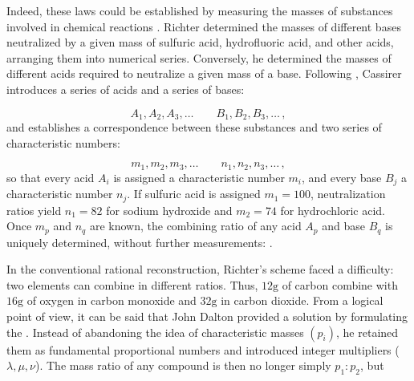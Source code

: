 \documentclass[submitted,12pt]{article}
\begin{document}
Indeed, these laws could be established by measuring the masses of substances involved in chemical reactions  . Richter determined the masses of different bases neutralized by a given mass of sulfuric acid, hydrofluoric acid, and other acids, arranging them into numerical series. Conversely, he determined the masses of different acids required to neutralize a given mass of a base. Following \citet[70]{Duhem1902}, Cassirer introduces a series of acids and a series of bases:

\begin{equation*}
A_1, A_2, A_3, \ldots \qquad B_1, B_2, B_3, \ldots\,,
\end{equation*}
%
and establishes a correspondence between these substances and two series of characteristic numbers:

\begin{equation*}
m_1, m_2, m_3, \ldots \qquad n_1, n_2, n_3, \ldots\,,
\end{equation*}
%
so that every acid $A_i$ is assigned a characteristic number $m_i$, and every base $B_j$ a characteristic number $n_j$. If sulfuric acid is assigned $m_1=100$, neutralization ratios yield $n_1=82$ for sodium hydroxide and $m_2=74$ for hydrochloric acid. Once $m_p$ and $n_q$ are known, the combining ratio of any acid $A_p$ and base $B_q$ is uniquely determined, without further measurements:  .

In the conventional rational reconstruction, Richter's scheme faced a difficulty: two elements can combine in different ratios. Thus, $12\text{g}$ of carbon combine with $16\text{g}$ of oxygen in carbon monoxide and $32\text{g}$ in carbon dioxide. From a logical point of view, it can be said that John Dalton provided a solution by formulating the . Instead of abandoning the idea of characteristic masses $\left(p_i\right)$, he retained them as fundamental proportional numbers and introduced integer multipliers ($\lambda, \mu, \nu$). The mass ratio of any compound is then no longer simply $p_1: p_2$, but
\end{document}
